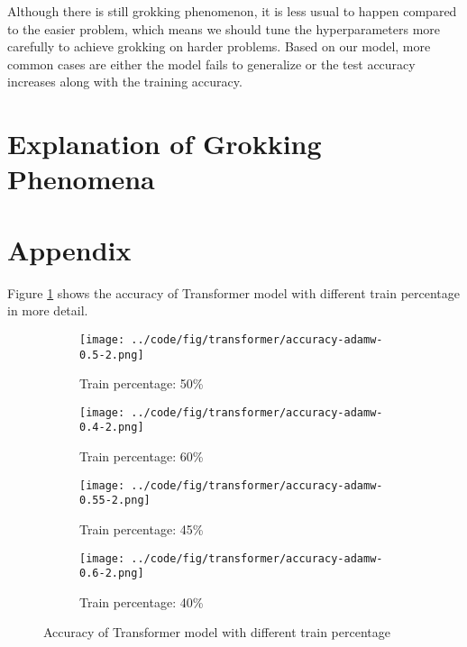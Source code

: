 \documentclass{article}
\begin{document}
Although there is still grokking phenomenon, it is less usual to happen compared to the easier problem, which means we should tune the hyperparameters more carefully to achieve grokking on harder problems. Based on our model, more common cases are either the model fails to generalize or the test accuracy increases along with the training accuracy.

\section{Explanation of Grokking Phenomena}

\appendix

\section{Appendix}

Figure \ref{fig:transformer-accuracy-all} shows the accuracy of Transformer model with different train percentage in more detail.

\begin{figure}[ht]
    \centering
    \begin{subfigure}{0.45\textwidth}
        \texttt{[image: ../code/fig/transformer/accuracy-adamw-0.5-2.png]}
        \caption{Train percentage: 50\%}
    \end{subfigure}
    \begin{subfigure}{0.45\textwidth}
        \texttt{[image: ../code/fig/transformer/accuracy-adamw-0.4-2.png]}
        \caption{Train percentage: 60\%}
    \end{subfigure}
    \begin{subfigure}{0.45\textwidth}
        \texttt{[image: ../code/fig/transformer/accuracy-adamw-0.55-2.png]}
        \caption{Train percentage: 45\%}
    \end{subfigure}
    \begin{subfigure}{0.45\textwidth}
        \texttt{[image: ../code/fig/transformer/accuracy-adamw-0.6-2.png]}
        \caption{Train percentage: 40\%}
    \end{subfigure}
    \caption{Accuracy of Transformer model with different train percentage}
    \label{fig:transformer-accuracy-all}
\end{figure}



\end{document}
